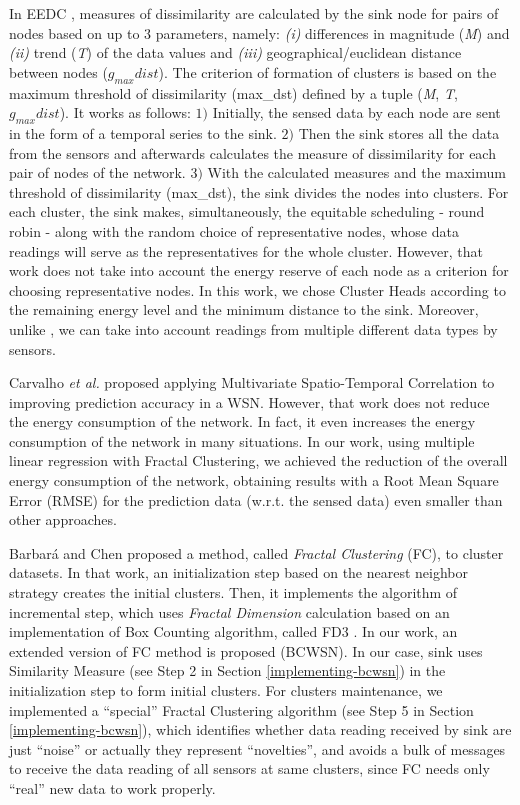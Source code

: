 \documentclass{acm_proc_article-sp}
\begin{document}
In EEDC \cite{Liu2007}, measures of dissimilarity are calculated by the sink
node for pairs of nodes based on up to $3$ parameters, namely: {\it (i)}
differences in magnitude (\textit{M}) and {\it (ii)} trend (\textit{T}) of the
data values and {\it (iii)} geographical/euclidean distance between nodes
($g_{max}dist$).
The criterion of formation of clusters is based on the maximum threshold of
dissimilarity (max\_dst) defined by a tuple (\textit{M}, \textit{T},
$g_{max}dist$). It works as follows: $1)$ Initially, the sensed data by each
node are sent in the form of a temporal series to the sink. $2)$ Then the sink
stores all the data from the sensors and afterwards calculates the measure of
dissimilarity for each pair of nodes of the network. $3)$ With the calculated
measures and the maximum threshold of dissimilarity (max\_dst), the sink divides
the nodes into clusters. For each cluster, the sink makes, simultaneously, the
equitable scheduling - round robin - along with the random choice of
representative nodes, whose data readings will serve as the representatives for
the whole cluster.
However, that work does not take into account the energy reserve of each node as
a criterion for choosing representative nodes. In this work, we chose Cluster
Heads according to the remaining energy level and the minimum distance to the
sink. Moreover, unlike \cite{Liu2007}, we can take into account readings from
multiple different data types by sensors.
\vspace*{-.3cm}

Carvalho \textit{et al.} \cite{Carvalho2011} proposed applying Multivariate
Spatio-Temporal Correlation to improving prediction accuracy in a WSN. However,
that work does not reduce the energy consumption of the network. In fact, it
even increases the energy consumption of the network in many situations. In our
work, using multiple linear regression with Fractal Clustering, we achieved the
reduction of the overall energy consumption of the network, obtaining results
with a Root Mean Square Error (RMSE) for the prediction data (w.r.t. the sensed
data) even smaller than other approaches.
\vspace*{-.3cm}

Barbar\'{a} and Chen \cite{Barbara2000} proposed a method, called {\it Fractal
Clustering} (FC), to cluster datasets. In that work, an initialization step
based on the nearest neighbor strategy creates the initial clusters. Then, it
implements the algorithm of incremental step, which uses \textit{Fractal
Dimension} calculation based on an implementation of Box Counting algorithm,
called FD3 \cite{Liebovitch1989}. In our work, an extended version of FC method
is proposed (BCWSN). In our case, sink uses Similarity Measure (see Step 2 in
Section \ref{implementing-bcwsn}) in the initialization step to form initial
clusters. For clusters maintenance, we implemented a ``special'' Fractal
Clustering algorithm (see Step 5 in Section \ref{implementing-bcwsn}), which
identifies whether data reading received by sink are just ``noise'' or actually
they represent ``novelties'', and avoids a bulk of messages to receive the data
reading of all sensors at same clusters, since FC needs only ``real'' new data
to work properly.
\vspace*{-.3cm}
\end{document}
